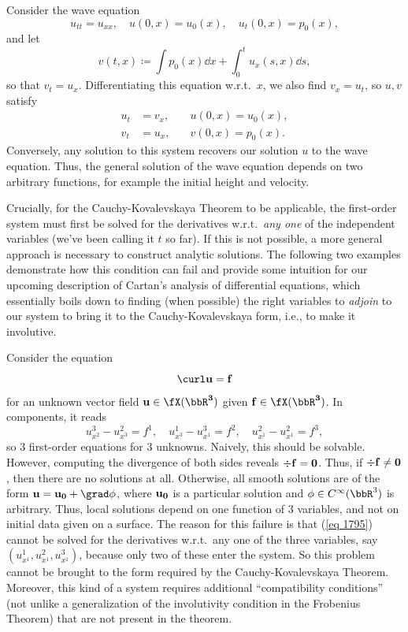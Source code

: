 \begin{example}\label{ex wave eq kovalevskaya}
    Consider the wave equation 
    \[u_{tt}=u_{xx},\quad u(0,x)=u_0(x),\quad u_t(0,x)=p_0(x),\]
    and let 
    \[v(t,x)\coloneqq \int p_0(x)\dd x+\int_0^t u_x(s,x)\dd s,\]
    so that $v_t=u_x$. Differentiating this equation w.r.t.\ $x$, we also find $v_x=u_t$, so $u,v$ satisfy 
    \begin{align}
        u_t&=v_x,\quad & u(0,x)=u_0(x),\\
        v_t&=u_x,\quad & v(0,x)=p_0(x).
    \end{align}
    Conversely, any solution to this system recovers our solution $u$ to the wave equation. Thus, the general solution of the wave equation depends on two arbitrary functions, for example the initial height and velocity.
\end{example}

Crucially, for the Cauchy-Kovalevskaya Theorem to be applicable, the first-order system must first be solved for the derivatives w.r.t.\ \emph{any one} of the independent variables (we've been calling it $t$ so far). If this is not possible, a more general approach is necessary to construct analytic solutions. The following two examples demonstrate how this condition can fail and provide some intuition for our upcoming description of Cartan's analysis of differential equations, which essentially boils down to finding (when possible) the right variables to \emph{adjoin} to our system to bring it to the Cauchy-Kovalevskaya form, i.e., to make it involutive.

\begin{example}
    Consider the equation 
    \[\curl \bf{u}=\bf{f}\]
    for an unknown vector field $\bf{u}\in\fX(\bbR^3)$ given $\bf{f}\in\fX(\bbR^3)$. In components, it reads 
    \[u^3_{x^2}-u^2_{x^3}=f^1,\quad u^1_{x^3}-u^3_{x^1}=f^2,\quad u^2_{x^1}-u^2_{x^1}=f^3,\label{eq 1795}\]
    so $3$ first-order equations for $3$ unknowns. Naively, this should be solvable. However, computing the divergence of both sides reveals $\div \bf{f}=0$. Thus, if $\div\bf{f}\neq 0$, then there are no solutions at all. Otherwise, all smooth solutions are of the form $\bf{u}=\bf{u}_0+\grad \phi$, where $\bf{u}_0$ is a particular solution and $\phi\in C^\infty(\bbR^3)$ is arbitrary. Thus, local solutions depend on one function of $3$ variables, and not on initial data given on a surface. The reason for this failure is that (\ref{eq 1795}) cannot be solved for the derivatives w.r.t.\ any one of the three variables, say $(u^1_{x^1},u^2_{x^1},u^3_{x^1})$, because only two of these enter the system. So this problem cannot be brought to the form required by the Cauchy-Kovalevskaya Theorem. Moreover, this kind of a system requires additional ``compatibility conditions'' (not unlike a generalization of the involutivity condition in the Frobenius Theorem) that are not present in the theorem.
\end{example}

